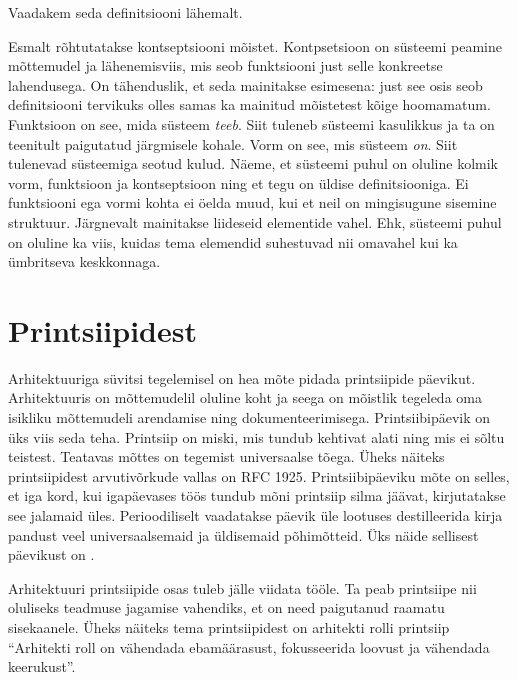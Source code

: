 Vaadakem seda definitsiooni lähemalt. 

Esmalt rõhtutatakse kontseptsiooni mõistet. Kontpsetsioon on süsteemi peamine mõttemudel ja lähenemisviis, mis seob funktsiooni just selle konkreetse lahendusega. On tähenduslik, et seda mainitakse esimesena: just see osis seob definitsiooni tervikuks olles samas ka mainitud mõistetest kõige hoomamatum. Funktsioon on see, mida süsteem \emph{teeb}. Siit tuleneb süsteemi kasulikkus ja ta on teenitult paigutatud järgmisele kohale. Vorm on see, mis süsteem \emph{on}. Siit tulenevad süsteemiga seotud kulud. Näeme, et süsteemi puhul on oluline kolmik vorm, funktsioon ja kontseptsioon ning et tegu on üldise definitsiooniga. Ei funktsiooni ega vormi kohta ei öelda muud, kui et neil on mingisugune sisemine struktuur. Järgnevalt mainitakse liideseid elementide vahel. Ehk, süsteemi puhul on oluline ka viis, kuidas tema elemendid suhestuvad nii omavahel kui ka ümbritseva keskkonnaga.

\section{Printsiipidest}
Arhitektuuriga süvitsi tegelemisel on hea mõte pidada printsiipide päevikut. Arhitektuuris on mõttemudelil oluline koht ja seega on mõistlik tegeleda oma isikliku mõttemudeli arendamise ning dokumenteerimisega. Printsiibipäevik on üks viis seda teha. Printsiip on miski, mis tundub kehtivat alati ning mis ei sõltu teistest. Teatavas mõttes on tegemist universaalse tõega. Üheks näiteks printsiipidest arvutivõrkude vallas on RFC 1925\cite{callon1996rfc}. Printsiibipäeviku mõte on selles, et iga kord, kui igapäevases töös tundub mõni printsiip silma jäävat, kirjutatakse see jalamaid üles. Perioodiliselt vaadatakse päevik üle lootuses destilleerida kirja pandust veel universaalsemaid ja üldisemaid põhimõtteid. Üks näide sellisest päevikust on \cite{archprinciples}. 

Arhitektuuri printsiipide osas tuleb jälle viidata \citeauthor{crawley2015systems} tööle. Ta peab printsiipe nii oluliseks teadmuse jagamise vahendiks, et on need paigutanud raamatu sisekaanele. Üheks näiteks tema printsiipidest on arhitekti rolli printsiip \enquote{Arhitekti roll on vähendada ebamäärasust, fokusseerida loovust ja vähendada keerukust}\cite{crawley2015systems}.

